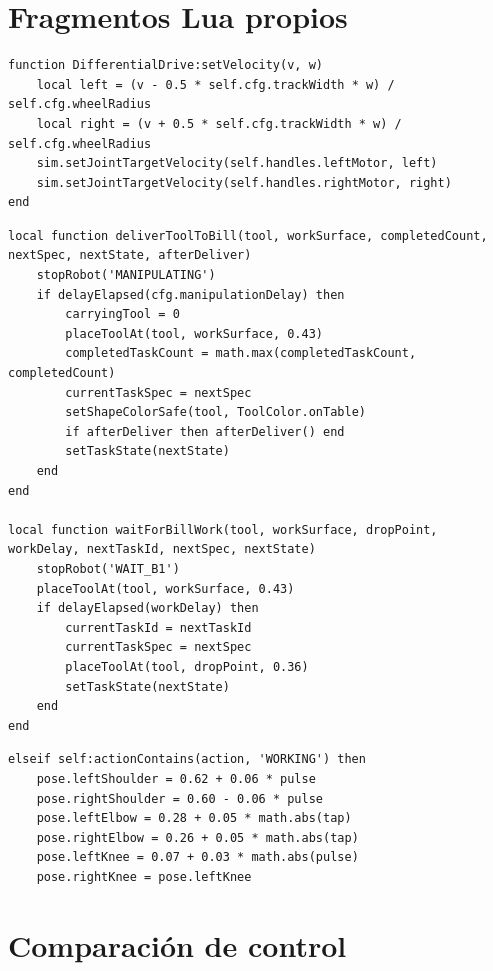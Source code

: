 \section{Fragmentos Lua propios}

\begin{lstlisting}[caption={Conversión de velocidad diferencial a ruedas.},label={lst:wheel-conversion-appendix}]
function DifferentialDrive:setVelocity(v, w)
    local left = (v - 0.5 * self.cfg.trackWidth * w) / self.cfg.wheelRadius
    local right = (v + 0.5 * self.cfg.trackWidth * w) / self.cfg.wheelRadius
    sim.setJointTargetVelocity(self.handles.leftMotor, left)
    sim.setJointTargetVelocity(self.handles.rightMotor, right)
end
\end{lstlisting}

\begin{lstlisting}[caption={Entrega, espera de trabajo humano y retorno de herramienta.},label={lst:handoff-appendix}]
local function deliverToolToBill(tool, workSurface, completedCount, nextSpec, nextState, afterDeliver)
    stopRobot('MANIPULATING')
    if delayElapsed(cfg.manipulationDelay) then
        carryingTool = 0
        placeToolAt(tool, workSurface, 0.43)
        completedTaskCount = math.max(completedTaskCount, completedCount)
        currentTaskSpec = nextSpec
        setShapeColorSafe(tool, ToolColor.onTable)
        if afterDeliver then afterDeliver() end
        setTaskState(nextState)
    end
end

local function waitForBillWork(tool, workSurface, dropPoint, workDelay, nextTaskId, nextSpec, nextState)
    stopRobot('WAIT_B1')
    placeToolAt(tool, workSurface, 0.43)
    if delayElapsed(workDelay) then
        currentTaskId = nextTaskId
        currentTaskSpec = nextSpec
        placeToolAt(tool, dropPoint, 0.36)
        setTaskState(nextState)
    end
end
\end{lstlisting}

\begin{lstlisting}[caption={Animación de Bill trabajando con brazos hacia la mesa.},label={lst:bill-arms-forward}]
elseif self:actionContains(action, 'WORKING') then
    pose.leftShoulder = 0.62 + 0.06 * pulse
    pose.rightShoulder = 0.60 - 0.06 * pulse
    pose.leftElbow = 0.28 + 0.05 * math.abs(tap)
    pose.rightElbow = 0.26 + 0.05 * math.abs(tap)
    pose.leftKnee = 0.07 + 0.03 * math.abs(pulse)
    pose.rightKnee = pose.leftKnee
\end{lstlisting}

\section{Comparación de control}

